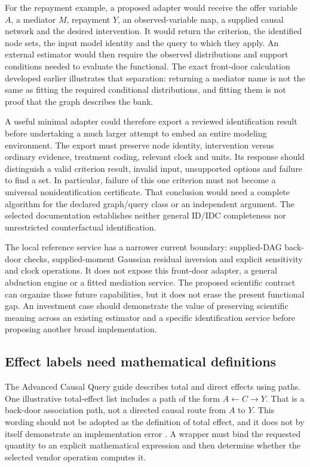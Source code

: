 For the repayment example, a proposed adapter would receive the offer variable
$A$, a mediator $M$, repayment $Y$, an observed-variable map, a supplied causal
network and the desired intervention. It would return the criterion, the
identified node sets, the input model identity and the query to which they
apply. An external estimator would then require the observed distributions
and support conditions needed to evaluate the functional. The exact
front-door calculation developed earlier illustrates that separation:
returning a mediator name is not the same as fitting the required conditional
distributions, and fitting them is not proof that the graph describes the bank.

A useful minimal adapter could therefore export a reviewed identification
result before undertaking a much larger attempt to embed an entire modeling
environment. The export must preserve node identity, intervention versus
ordinary evidence, treatment coding, relevant clock and units. Its response
should distinguish a valid criterion result, invalid input, unsupported
options and failure to find a set. In particular, failure of this one
criterion must not become a universal nonidentification certificate. That
conclusion would need a complete algorithm for the declared graph/query class
or an independent argument. The selected documentation establishes neither
general ID/IDC completeness nor unrestricted counterfactual identification.

The local reference service has a narrower current boundary: supplied-DAG
back-door checks, supplied-moment Gaussian residual inversion and explicit
sensitivity and clock operations. It does not expose this front-door adapter,
a general abduction engine or a fitted mediation service. The proposed
scientific contract can organize those future capabilities, but it does not
erase the present functional gap. An investment case should demonstrate the
value of preserving scientific meaning across an existing estimator and a
specific identification service before proposing another broad implementation. \citep{exec14_ci_comparison}

\subsection{Effect labels need mathematical definitions}

The Advanced Causal Query guide describes total and direct effects using paths.
One illustrative total-effect list includes a path of the form
$A\leftarrow C\rightarrow Y$. That is a back-door association path, not a
directed causal route from $A$ to $Y$. This wording should not be adopted as
the definition of total effect, and it does not by itself demonstrate an
implementation error \citep{exec14_ci_causal_query}. A wrapper must bind the
requested quantity to an explicit mathematical expression and then determine
whether the selected vendor operation computes it.


